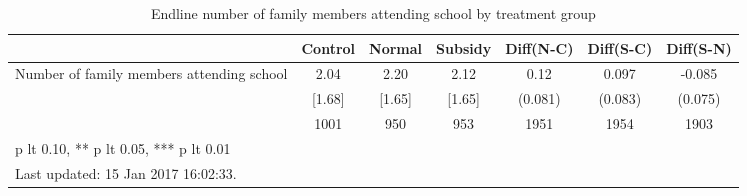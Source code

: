 \begin{table}[htbp]\centering
\def\sym#1{\ifmmode^{#1}\else\(^{#1}\)\fi}
\caption{Endline number of family members attending school by treatment group \label{tab:"balance"}}
\begin{tabular*}{1\hsize}{@{\hskip\tabcolsep\extracolsep\fill}l*{1}{cccccc}}
\toprule
                                &  Control&   Normal&  Subsidy&Diff(N-C)         &Diff(S-C)         &Diff(S-N)         \\
\midrule
Number of family members attending school&     2.04&     2.20&     2.12&     0.12         &    0.097         &   -0.085         \\
                                &   [1.68]&   [1.65]&   [1.65]&  (0.081)         &  (0.083)         &  (0.075)         \\
                                &     1001&      950&      953&     1951         &     1954         &     1903         \\
\bottomrule
\multicolumn{7}{l}{\footnotesize * p lt 0.10, ** p lt 0.05, *** p lt 0.01}\\
\multicolumn{7}{l}{\footnotesize Last updated: 15 Jan 2017 16:02:33.}\\
\end{tabular*}
\end{table}
